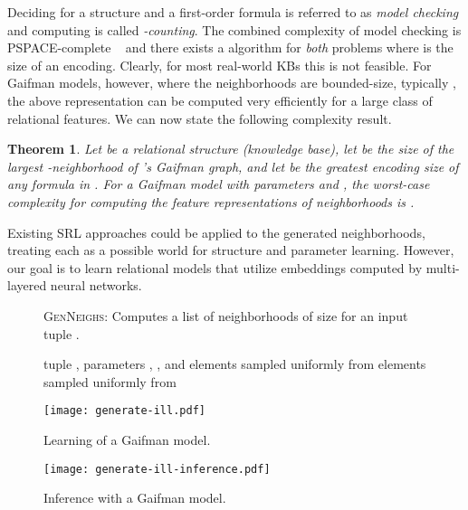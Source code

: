 \documentclass{article}
\newtheorem{theorem}{Theorem}
\begin{document}
Deciding  for a structure  and a first-order formula  is referred to as \emph{model checking} and computing  is called \emph{-counting}.  The combined complexity of model checking is PSPACE-complete ~\cite{vardi:1982} and there exists a  algorithm for \emph{both} problems where  is the size of an encoding. Clearly, for most real-world KBs this is not feasible. For Gaifman models, however, where the neighborhoods are bounded-size, typically , the above representation can be computed very efficiently for a large class of relational features.  We can now state the following complexity result. 

\begin{theorem}
Let  be a relational structure (knowledge base), let  be the size of the largest -neighborhood of 's Gaifman graph, and let  be the greatest encoding size of any formula in . 
For a Gaifman model with parameters  and , the worst-case complexity for computing the feature representations of  neighborhoods is .
\end{theorem}

Existing SRL approaches could be applied to the generated neighborhoods, treating each as a possible world for structure and parameter learning. However, our goal is to learn relational models that utilize embeddings computed by multi-layered neural networks. 

\small
\begin{figure}[t!]
\begin{minipage}[b]{.50\textwidth}
\begin{algorithm}[H]
\caption{\label{alg:generate}\textsc{GenNeighs}: Computes a list of  neighborhoods of size  for an input tuple .}
\begin{algorithmic}[1]
	 tuple , parameters , , and 
   \STATE 
   \WHILE{}
   \STATE 
   \STATE 
   \FORALL  {}
   \STATE  elements sampled uniformly from 
   \STATE 
   \STATE 
   \ENDFOR
   \STATE  elements sampled uniformly from 
   \STATE 
   \STATE 
   \ENDWHILE
\end{algorithmic}
\end{algorithm}
\end{minipage}\hspace{5mm}
\begin{minipage}[b]{.46\textwidth}
  \centering
\texttt{[image: generate-ill.pdf]}\caption{\label{fig-learning-example}Learning of a  Gaifman model.}
\vspace{5mm}
\texttt{[image: generate-ill-inference.pdf]}\caption{\label{fig-inference-example}Inference with a Gaifman model.}\end{minipage}
\end{figure}
\normalsize
\end{document}
